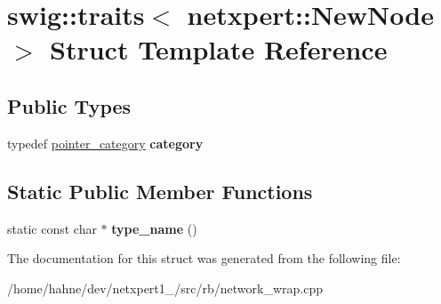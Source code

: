 \hypertarget{structswig_1_1traits_3_01netxpert_1_1NewNode_01_4}{}\section{swig\+:\+:traits$<$ netxpert\+:\+:New\+Node $>$ Struct Template Reference}
\label{structswig_1_1traits_3_01netxpert_1_1NewNode_01_4}
\subsection*{Public Types}
\begin{DoxyCompactItemize}
\item 
typedef \hyperlink{structswig_1_1pointer__category}{pointer\+\_\+category} {\bfseries category}\hypertarget{structswig_1_1traits_3_01netxpert_1_1NewNode_01_4_ad8bb93a08287824bb8630d5092e0290a}{}\label{structswig_1_1traits_3_01netxpert_1_1NewNode_01_4_ad8bb93a08287824bb8630d5092e0290a}

\end{DoxyCompactItemize}
\subsection*{Static Public Member Functions}
\begin{DoxyCompactItemize}
\item 
static const char $\ast$ {\bfseries type\+\_\+name} ()\hypertarget{structswig_1_1traits_3_01netxpert_1_1NewNode_01_4_a3ef82ebb15fae8bf2aef87e02ca2ed38}{}\label{structswig_1_1traits_3_01netxpert_1_1NewNode_01_4_a3ef82ebb15fae8bf2aef87e02ca2ed38}

\end{DoxyCompactItemize}


The documentation for this struct was generated from the following file\+:\begin{DoxyCompactItemize}
\item 
/home/hahne/dev/netxpert1\+\_/src/rb/network\+\_\+wrap.\+cpp\end{DoxyCompactItemize}
